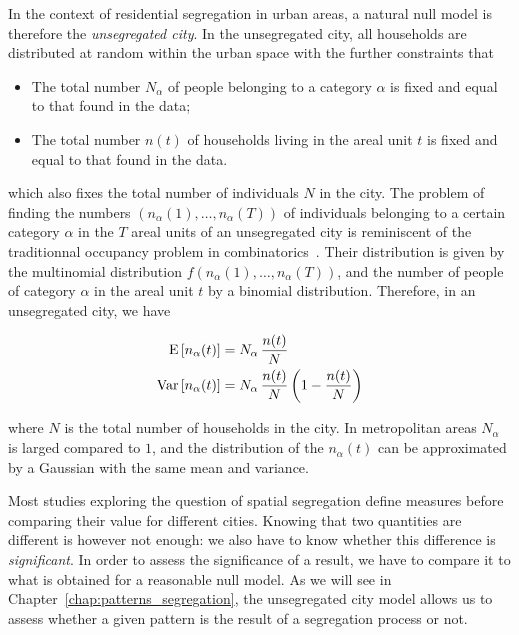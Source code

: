 In the context of residential segregation in urban areas, a natural null model
is therefore the \emph{unsegregated city}. In the unsegregated city, all
households are distributed at random within the urban space with the further
constraints that

\begin{itemize}
    \item The total number $N_\alpha$ of people belonging to a category
	    $\alpha$ is fixed and equal to that found in the data;
    \item The total number $n(t)$ of households living in the areal unit $t$ is
	    fixed and equal to that found in the data.
\end{itemize}

which also fixes the total number of individuals $N$ in the city. The problem of
finding the numbers $\left( n_\alpha(1), \dots, n_\alpha(T) \right)$ of
individuals belonging to a certain category $\alpha$ in the $T$ areal units of
an unsegregated city is reminiscent of the traditionnal occupancy problem in
combinatorics~\cite{Feller:1950}. Their distribution is given by the multinomial
distribution $f \left( n_\alpha(1), \dots, n_\alpha(T) \right)$, and the number
of people of category $\alpha$ in the areal unit $t$ by a binomial distribution.
Therefore, in an unsegregated city, we have

\begin{align}
    \begin{split}
	\mathrm{E} \left[ n_\alpha(t) \right] &= N_\alpha\,\frac{n(t)}{N} \\
	\mathrm{Var} \left[ n_\alpha(t) \right] &= N_\alpha\,\frac{n(t)}{N} \left( 1 - \frac{n(t)}{N}  \right) 
    \end{split}
\end{align}

where $N$ is the total number of households in the city. In metropolitan areas
$N_\alpha$ is larged compared to $1$, and the distribution of the $n_\alpha(t)$
can be approximated by a Gaussian with the same mean and variance.


Most studies exploring the question of spatial segregation define measures
before comparing their value for different cities. Knowing that two quantities
are different is however not enough: we also have to know whether this
difference is {\em significant}. In order to assess the significance of a
result, we have to compare it to what is obtained for a reasonable null model.
As we will see in Chapter~\ref{chap:patterns_segregation}, the 
unsegregated city model allows us to assess whether a given pattern is
the result of a segregation process or not.

